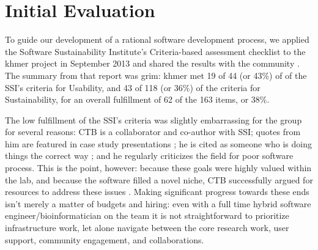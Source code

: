 \documentclass[11pt]{article}
\begin{document}

\section{Initial Evaluation}

To guide our development of a rational software development process,
we applied the Software Sustainability Institute's Criteria-based
assessment checklist \cite{SSI-eval-guide} to the khmer project in
September 2013 and shared the results with the community
\cite{khmer-assessment}. The summary from that report was grim: khmer
met 19 of 44 (or 43\%) of of the SSI's criteria for Usability, and 43
of 118 (or 36\%) of the criteria for Sustainability, for an overall
fulfillment of 62 of the 163 items, or 38\%.


The low fulfillment of the SSI's criteria was slightly embarrassing for
the group for several reasons: CTB is a collaborator and co-author
with SSI; quotes from him are featured in case study presentations
\cite{SSI-casestudies}; he is cited as someone who is doing things the
correct way \cite{SSI-recomputation}; and he regularly criticizes the
field for poor software process.  This is the point, however: because
these goals were highly valued within the lab, and because the
software filled a novel niche, CTB successfully argued for resources
to address these issues \cite{khmer-future}.  Making significant
progress towards these ends isn't merely a matter of budgets and
hiring: even with a full time hybrid software
engineer/bioinformatician on the team it is not straightforward to
prioritize infrastructure work, let alone navigate between the core
research work, user support, community engagement, and collaborations.

\end{document}
